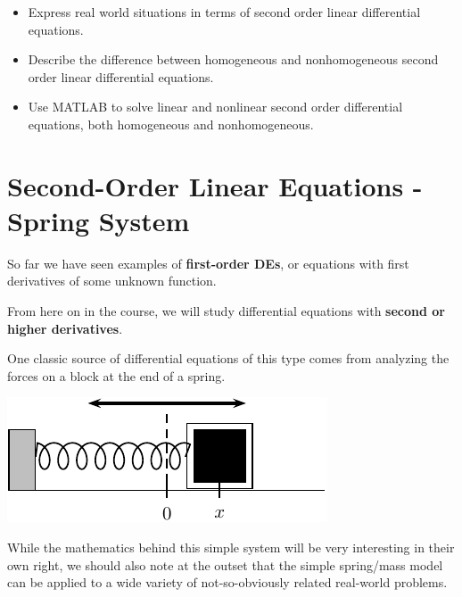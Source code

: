 


\newcommand{\Fe}{ F_{\mbox{ext}} }


\setfont
\pagestyle{fancy}
\renewcommand{\Week}{8 }
\renewcommand{\WeekTitle}{\WeekTitleEight }

\fancyhead[LE,RO]{Week \Week}  %
\fancyfoot{}
\sectionbox{Week \#\Week: \WeekTitle}

\vspace{5mm}
\goals
\begin{itemize}
\item Express real world situations in terms of second order linear
  differential equations.
\item Describe the difference between homogeneous and nonhomogeneous
  second order linear differential equations.
\item Use MATLAB to solve linear and nonlinear second order
  differential equations, both homogeneous and nonhomogeneous.
\end{itemize}
\vspace{5mm}

\newpage

\section*{Second-Order Linear Equations - Spring System}

So far we have seen examples of {\bf first-order DEs}, or equations
with first derivatives of some unknown function.  

From here on in the course, we will study differential equations with
{\bf second or higher derivatives}.

One classic source of differential equations of this type comes from 
analyzing the forces on a block at the end of a spring.
\begin{center}
\includegraphics[width=0.5\linewidth]{graphics/notes_08_block}
\end{center}


While the mathematics behind this simple system will be very
interesting in their own right, we should also note at the outset that
the simple spring/mass model can be applied to a wide variety of
not-so-obviously related real-world problems.


